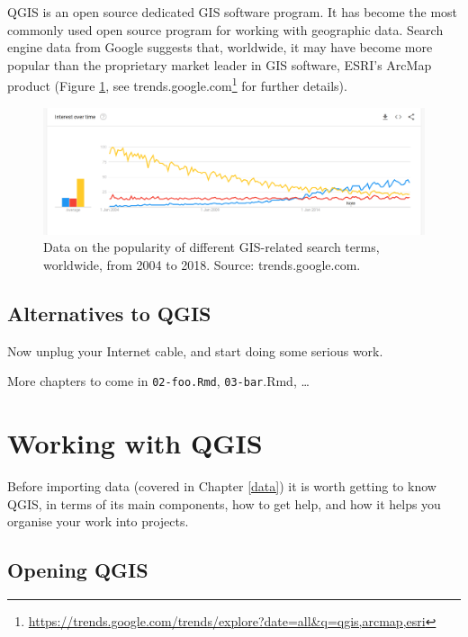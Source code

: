 \documentclass[10pt,a5paper,]{book}
\renewcommand{\href}[2]{#2\footnote{\url{#1}}}
\begin{document}
QGIS is an open source dedicated GIS software program.
It has become the most commonly used open source program for working with geographic data.
Search engine data from Google suggests that, worldwide, it may have become more popular than the proprietary market leader in GIS software, ESRI's ArcMap product (Figure \ref{fig:qgis-vs-arcmap}, see \href{https://trends.google.com/trends/explore?date=all\&q=qgis,arcmap,esri}{trends.google.com} for further details).

\begin{figure}
\includegraphics[width=1\linewidth]{figures/qgis-vs-arcmap} \caption{Data on the popularity of different GIS-related search terms, worldwide, from 2004 to 2018. Source: trends.google.com.}\label{fig:qgis-vs-arcmap}
\end{figure}

\hypertarget{alternatives-to-qgis}{%
\section{Alternatives to QGIS}\label{alternatives-to-qgis}}

Now unplug your Internet cable, and start doing some serious work.

More chapters to come in \texttt{02-foo.Rmd}, \texttt{03-bar}.Rmd, \ldots{}

\hypertarget{working-with-qgis}{%
\chapter{Working with QGIS}\label{working-with-qgis}}

Before importing data (covered in Chapter \ref{data}) it is worth getting to know QGIS, in terms of its main components, how to get help, and how it helps you organise your work into projects.

\hypertarget{opening-qgis}{%
\section{Opening QGIS}\label{opening-qgis}}
\end{document}

